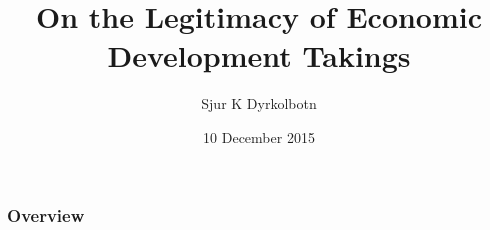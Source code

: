 \documentclass{beamer}
\title[]{On the Legitimacy of Economic Development Takings} %
\author{Sjur K Dyrkolbotn} %
\institute[Durham University, Utrecht University] %
{
Durham University, Utrecht University \\ %
\medskip
\textit{s.k.dyrkolbotn@durham.ac.uk} %
}
\date{10 December 2015} %
\begin{document}
\begin{frame}
\titlepage %
\end{frame}

\begin{frame}
\frametitle{Overview} %
\tableofcontents %
\end{frame}

\end{document}
